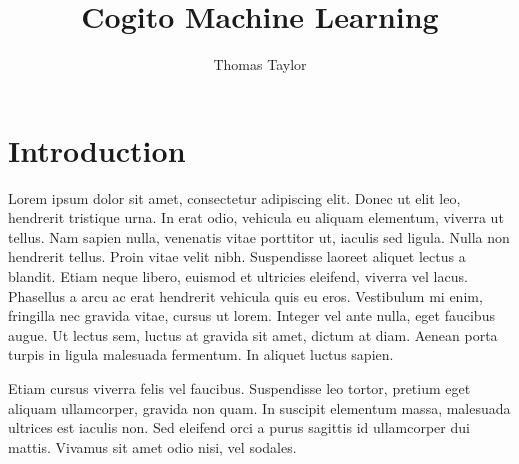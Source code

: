 \documentclass[runningheads,a4paper]{llncs}
\begin{document}
\mainmatter  

\title{Cogito Machine Learning}
\titlerunning{}
\author{Thomas Taylor\\ \mail}
\authorrunning{} %

\maketitle


\section{Introduction}

Lorem ipsum dolor sit amet, consectetur adipiscing elit. Donec ut elit leo, hendrerit tristique urna. In erat odio, vehicula eu aliquam elementum, viverra ut tellus. Nam sapien nulla, venenatis vitae porttitor ut, iaculis sed ligula. Nulla non hendrerit tellus. Proin vitae velit nibh. Suspendisse laoreet aliquet lectus a blandit. Etiam neque libero, euismod et ultricies eleifend, viverra vel lacus. Phasellus a arcu ac erat hendrerit vehicula quis eu eros. Vestibulum mi enim, fringilla nec gravida vitae, cursus ut lorem. Integer vel ante nulla, eget faucibus augue. Ut lectus sem, luctus at gravida sit amet, dictum at diam. Aenean porta turpis in ligula malesuada fermentum. In aliquet luctus sapien.

Etiam cursus viverra felis vel faucibus. Suspendisse leo tortor, pretium eget aliquam ullamcorper, gravida non quam. In suscipit elementum massa, malesuada ultrices est iaculis non. Sed eleifend orci a purus sagittis id ullamcorper dui mattis. Vivamus sit amet odio nisi, vel sodales.





\end{document}
